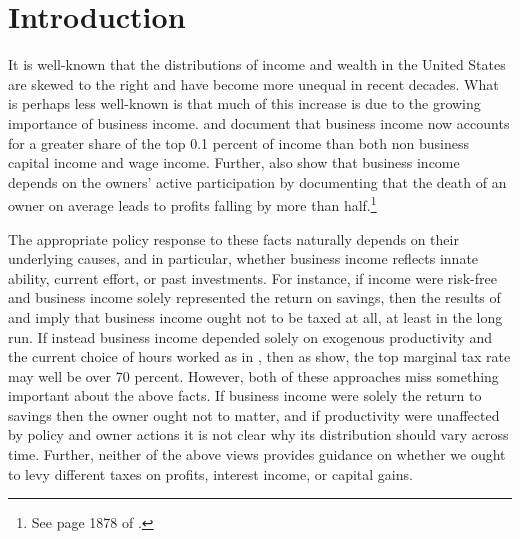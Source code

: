 \documentclass[11pt]{article}
\theoremstyle{plain}
\begin{document}

\newpage

\section{Introduction} \label{intro}


It is well-known that the distributions of income and wealth in the United States are skewed to the right and have become more unequal in recent decades. What is perhaps less well-known is that much of this increase is due to the growing importance of business income. \cite{smith_capitalists_2019} and \cite{cooper_business_2016} document that business income now accounts for a greater share of the top 0.1 percent of income than both non business capital income and wage income. Further, \cite{smith_capitalists_2019} also show that business income depends on the owners' active participation by documenting that the death of an owner on average leads to profits falling by more than half.\footnote{See page 1878 of \cite{smith_capitalists_2019}.}


The appropriate policy response to these facts naturally depends on their underlying causes, and in particular, whether business income reflects innate ability, current effort, or past investments. For instance, if income were risk-free and business income solely represented the return on savings, then the results of \cite{chamley_optimal_1986} and \cite{judd_redistributive_1985} imply that business income ought not to be taxed at all, at least in the long run. If instead business income depended solely on exogenous productivity and the current choice of hours worked as in \cite{mirrlees_exploration_1971}, then as \cite{diamond_case_2011} show, the top marginal tax rate may well be over 70 percent. However, both of these approaches miss something important about the above facts. If business income were solely the return to savings then the owner ought not to matter, and if productivity were unaffected by policy and owner actions it is not clear why its distribution should vary across time. Further, neither of the above views provides guidance on whether we ought to levy different taxes on profits, interest income, or capital gains. 
\end{document}
